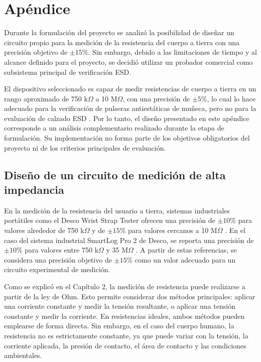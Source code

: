 \chapter{Apéndice}
\label{ap:medicion_alta_impedancia}

Durante la formulación del proyecto se analizó la posibilidad de diseñar un
circuito propio para la medición de la resistencia del cuerpo a tierra con una
precisión objetivo de $\pm 15\%$. Sin embargo, debido a las limitaciones de
tiempo y al alcance definido para el proyecto, se decidió utilizar un probador
comercial como subsistema principal de verificación ESD.

El dispositivo seleccionado es capaz de medir resistencias de cuerpo a tierra en
un rango aproximado de 750 k$\Omega$ a 10 M$\Omega$, con una precisión de
$\pm 5\%$, lo cual lo hace adecuado para la verificación de pulseras
antiestáticas de muñeca, pero no para la evaluación de calzado ESD
\cite{hzr171_oficial}. Por lo tanto, el diseño presentado en este apéndice corresponde
a un análisis complementario realizado durante la etapa de formulación. Su
implementación no forma parte de los objetivos obligatorios del proyecto ni de
los criterios principales de evaluación.

\section{Diseño de un circuito de medición de alta impedancia}

En la medición de la resistencia del usuario a tierra, sistemas industriales
portátiles como el Desco Wrist Strap Tester ofrecen una precisión de
$\pm 10\%$ para valores alrededor de 750 k$\Omega$ y de $\pm 15\%$ para
valores cercanos a 10 M$\Omega$ \cite{Desco_19240}. En el caso del sistema
industrial SmartLog Pro 2 de Desco, se reporta una precisión de $\pm 10\%$
para valores entre 750 k$\Omega$ y 35 M$\Omega$ \cite{Desco_SmartLog}. A
partir de estas referencias, se considera una precisión objetivo de
$\pm 15\%$ como un valor adecuado para un circuito experimental de medición.

Como se explicó en el Capítulo 2, la medición de resistencia puede realizarse a
partir de la ley de Ohm. Esto permite considerar dos métodos principales:
aplicar una corriente constante y medir la tensión resultante, o aplicar una
tensión constante y medir la corriente. En resistencias ideales, ambos métodos
pueden emplearse de forma directa. Sin embargo, en el caso del cuerpo humano,
la resistencia no es estrictamente constante, ya que puede variar con la
tensión, la corriente aplicada, la presión de contacto, el área de contacto y
las condiciones ambientales.

